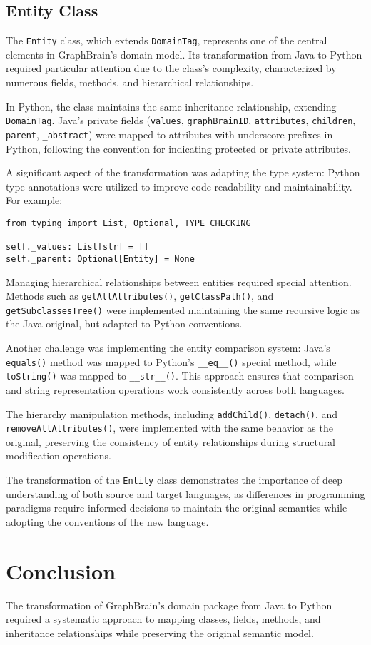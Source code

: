 \documentclass[12pt,a4paper]{article}
\begin{document}
\subsection{Entity Class}

The \texttt{Entity} class, which extends \texttt{DomainTag}, represents one of the central elements in GraphBrain's domain model. Its transformation from Java to Python required particular attention due to the class's complexity, characterized by numerous fields, methods, and hierarchical relationships.

In Python, the class maintains the same inheritance relationship, extending \texttt{DomainTag}. Java's private fields (\texttt{values}, \texttt{graphBrainID}, \texttt{attributes}, \texttt{children}, \texttt{parent}, \texttt{\_abstract}) were mapped to attributes with underscore prefixes in Python, following the convention for indicating protected or private attributes.

A significant aspect of the transformation was adapting the type system: Python type annotations were utilized to improve code readability and maintainability. For example:

\begin{verbatim}
from typing import List, Optional, TYPE_CHECKING

self._values: List[str] = []
self._parent: Optional[Entity] = None
\end{verbatim}

Managing hierarchical relationships between entities required special attention. Methods such as \texttt{getAllAttributes()}, \texttt{getClassPath()}, and \texttt{getSubclassesTree()} were implemented maintaining the same recursive logic as the Java original, but adapted to Python conventions.

Another challenge was implementing the entity comparison system: Java's \texttt{equals()} method was mapped to Python's \texttt{\_\_eq\_\_()} special method, while \texttt{toString()} was mapped to \texttt{\_\_str\_\_()}. This approach ensures that comparison and string representation operations work consistently across both languages.

The hierarchy manipulation methods, including \texttt{addChild()}, \texttt{detach()}, and \texttt{removeAllAttributes()}, were implemented with the same behavior as the original, preserving the consistency of entity relationships during structural modification operations.

The transformation of the \texttt{Entity} class demonstrates the importance of deep understanding of both source and target languages, as differences in programming paradigms require informed decisions to maintain the original semantics while adopting the conventions of the new language.




\section{Conclusion}
The transformation of GraphBrain's domain package from Java to Python required a systematic approach to mapping classes, fields, methods, and inheritance relationships while preserving the original semantic model.
\end{document}
